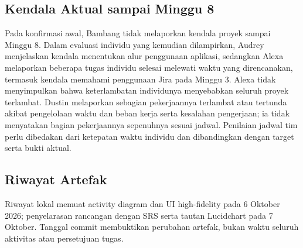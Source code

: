 \documentclass[11pt,a4paper]{article}
\begin{document}
\subsection{Kendala Aktual sampai Minggu 8}
Pada konfirmasi awal, Bambang tidak melaporkan kendala proyek sampai Minggu 8. Dalam evaluasi individu yang kemudian dilampirkan, Audrey menjelaskan kendala menentukan alur penggunaan aplikasi, sedangkan Alexa melaporkan beberapa tugas individu selesai melewati waktu yang direncanakan, termasuk kendala memahami penggunaan Jira pada Minggu 3. Alexa tidak menyimpulkan bahwa keterlambatan individunya menyebabkan seluruh proyek terlambat. Dustin melaporkan sebagian pekerjaannya terlambat atau tertunda akibat pengelolaan waktu dan beban kerja serta kesalahan pengerjaan; ia tidak menyatakan bagian pekerjaannya sepenuhnya sesuai jadwal. Penilaian jadwal tim perlu dibedakan dari ketepatan waktu individu dan dibandingkan dengan target serta bukti aktual. \cite{audreyind,dustinind,alexaind}
\subsection{Riwayat Artefak}
Riwayat lokal memuat activity diagram dan UI high-fidelity pada 6 Oktober 2026; penyelarasan rancangan dengan SRS serta tautan Lucidchart pada 7 Oktober. Tanggal commit membuktikan perubahan artefak, bukan waktu seluruh aktivitas atau persetujuan tugas.
\end{document}

